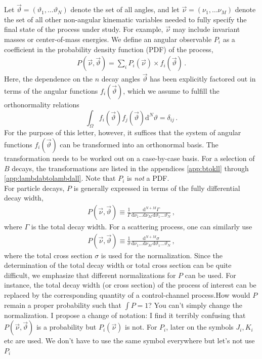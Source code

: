 \documentclass[aps,prd,reprint,nofootinbib,preprintnumbers]{revtex4}
\newcommand{\dd}{\text{d}}
\newcommand{\nuvec}{\vec{\nu}}
\newcommand{\thvec}{\vec{\vartheta}}
\renewcommand{\theta}{\vartheta}
\newcommand{\fred}[1]{{\color{brown!85!black}#1}}
\begin{document}
Let $\thvec = (\theta_1, \dots \theta_N)$ denote the set of all
angles, and let $\nuvec = (\nu_1, \dots \nu_M)$ denote the set of all
other non-angular kinematic variables needed to fully specify the
final state of the process under study. For example, $\nuvec$ may
include invariant masses or center-of-mass energies. We define an
angular observable $P_i$ as a coefficient in the probability density
function (PDF) of the process,
\begin{align}
    \label{eq:def-P}
    P(\nuvec, \thvec) = \sum_i P_i(\nuvec) \times f_i(\thvec)\,.
\end{align}
Here, the dependence on the $n$ decay angles $\thvec$ has been
explicitly factored out in terms of the angular functions
$f_i(\thvec)$, which we assume to fulfill the orthonormality relations
\begin{equation}
    \label{eq:def-ortho-rel}
    \int_\Omega f_i(\thvec) f_j(\thvec) \dd^N \theta = \delta_{ij}\,.
\end{equation}
For the purpose of this letter, however, it suffices that the system
of angular functions $f_i(\thvec)$ can be transformed into an
orthonormal basis. The transformation needs to be worked out on a
case-by-case basis. For a selection of $B$ decays, the transformations
are listed in the appendices \ref{app:btokll} through
\ref{app:lambdabtolambdall}.  Note that $P_i$ is \emph{not} a PDF.  \\


For particle decays, $P$ is generally expressed in terms of the fully differential decay width,
\begin{align}
    \label{eq:def-P-decay}
    P(\nuvec, \thvec) \equiv \frac{1}{\Gamma}\frac{\dd^{N+M}\Gamma}{\dd \nu_1 \dots \dd \nu_M\, \dd \theta_1 \dots \theta_N}\,,
\end{align}
where $\Gamma$ is the total decay width. For a scattering process, one can similarly use
\begin{align}
    \label{eq:def-P-scattering}
    P(\nuvec, \thvec) \equiv \frac{1}{\sigma}\frac{\dd^{N+M}\sigma}{\dd \nu_1 \dots \dd \nu_M\, \dd \theta_1 \dots \theta_N}\,,
\end{align}
where the total cross section $\sigma$ is used for the
normalization. Since the determination of the total decay width or
total cross section can be quite difficult, we emphasize that
different normalizations for $P$ can be used.  For instance, the total
decay width (or cross section) of the process of interest can be
replaced by the corresponding quantity of a control-channel
process.\fred{How would $P$ remain a proper probability such that
  $\int P = 1$? You can't simply change the normalization. I propose a
  change of notation: I find it terribly confusing that $P(\nuvec,
  \thvec)$ is a probability but $P_i(\nuvec)$ is not. For $P_i$, later
  on the symbols $J_i, K_i$ etc are used. We don't have to use the
  same symbol everywhere but let's not use $P_i$}\\
\end{document}
